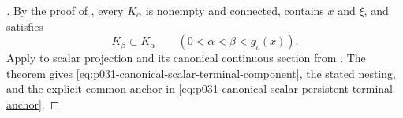 \begin{proof}[]
By the proof of
, every $K_\alpha$ is
nonempty and connected, contains $x$ and $\xi$, and satisfies
\[
             K_\beta\subset K_\alpha
             \qquad(0<\alpha<\beta<g_v(x)).
\]
Apply
 to scalar
projection and its canonical continuous section from
.  The theorem gives
\eqref{eq:p031-canonical-scalar-terminal-component}, the stated nesting, and
the explicit common anchor in
\eqref{eq:p031-canonical-scalar-persistent-terminal-anchor}.
\end{proof}
